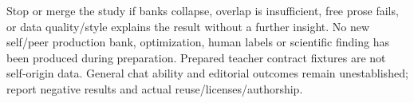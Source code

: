 \documentclass[11pt,a4paper]{article}
\begin{document}
Stop or merge the study if banks collapse, overlap is insufficient, free prose
fails, or data quality/style explains the result without a further insight.
No new self/peer production bank, optimization, human labels or scientific
finding has been produced during preparation. Prepared teacher contract
fixtures are not self-origin data. General chat ability and editorial outcomes
remain unestablished; report negative results and actual reuse/licenses/authorship.

\end{document}
